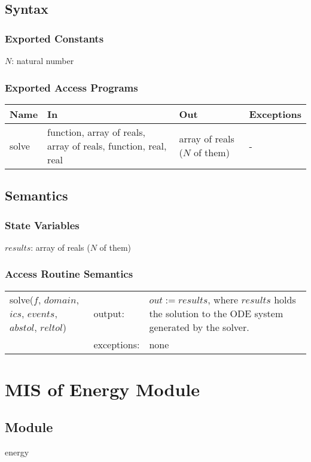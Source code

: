 \documentclass[12pt]{article}
\begin{document}
\subsection{Syntax}
\subsubsection{Exported Constants}
$N$: natural number
\subsubsection{Exported Access Programs}
\begin{center}
\begin{tabular}{p{2cm} p{5cm} p{5cm} p{2cm}}
\hline
\textbf{Name} & \textbf{In} & \textbf{Out} & \textbf{Exceptions} \\
\hline
solve & function, array of reals, array of reals, function, real, real & array of reals ($N$ of them) & - \\
\hline 
\end{tabular}
\end{center}
\subsection{Semantics}
\subsubsection{State Variables}
$results$: array of reals ($N$ of them)
\subsubsection{Access Routine Semantics}
\begin{center}
\begin{tabular}{l l p{5cm}}
solve($f$, $domain$, $ics$, $events$, $abstol$, $reltol$) & output: & $out := results$, where $results$ holds the solution to the ODE system generated by the solver. \\
& exceptions: & none \\
\end{tabular}
\end{center}

\section{MIS of Energy Module} \label{Energy}
\subsection{Module}
energy
\end{document}
